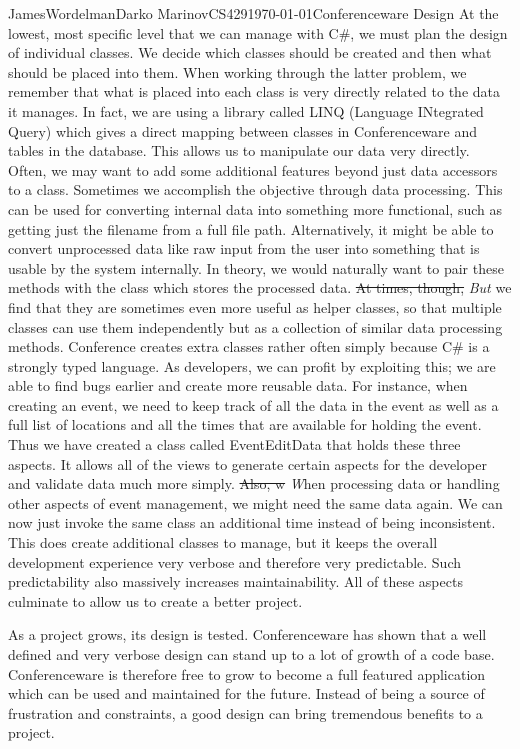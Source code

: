 \documentclass[12pt,letterpaper]{article}
\begin{document}
\begin{mla}{James}{Wordelman}{Darko Marinov}{CS429}{\today}{Conferenceware
Design}
At the lowest, most specific level that we can manage with C\#, we must plan the design of individual classes. We decide which classes should be created and then what should be placed into them. When working through the latter problem, we remember that what is placed into each class is very directly related to the data it manages. In fact, we are using a library called LINQ (Language INtegrated Query) which gives a direct mapping between classes in Conferenceware and tables in the database. This allows us to manipulate our data very directly. Often, we may want to add some additional features beyond just data accessors to a class.  Sometimes we accomplish the objective through data processing. This can be used for converting internal data into something more functional, such as getting just the filename from a full file path. Alternatively, it might be able to convert unprocessed data like raw input from the user into something that is usable by the system internally.  In theory, we would naturally want to pair these methods with the class which stores the processed data.  \sout{At times, though,} \textit{But} we find that they are sometimes even more useful as helper classes, so that multiple classes can use them independently but as a collection of similar data processing methods. Conference creates extra classes rather often simply because C\# is a strongly typed language. As developers, we can profit by exploiting this; we are able to find bugs earlier and create more reusable data.  For instance, when creating an event, we need to keep track of all the data in the event as well as a full list of locations and all the times that are available for holding the event. Thus we have created a class called EventEditData that holds these three aspects. It allows all of the views to generate certain aspects for the developer and validate data much more simply. \sout{Also, w} \textit{W}hen processing data or handling other aspects of event management, we might need the same data again. We can now just invoke the same class an additional time instead of being inconsistent. This does create additional classes to manage, but it keeps the overall development experience very verbose and therefore very predictable. Such predictability also massively increases maintainability. All of these aspects culminate to allow us to create a better project.

As a project grows, its design is tested. Conferenceware has shown that a well defined and very verbose design can stand up to a lot of growth of a code base. Conferenceware is therefore free to grow to become a full featured application which can be used and maintained for the future. Instead of being a source of frustration and constraints, a good design can bring tremendous benefits to a project.
\end{mla}
\end{document}
